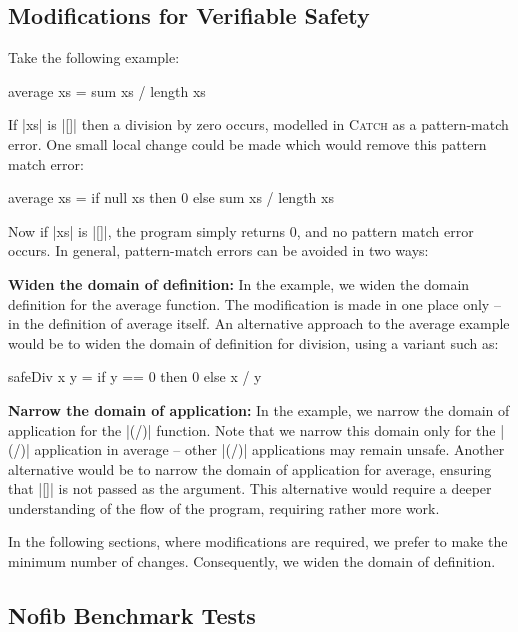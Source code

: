 \documentclass[preprint]{sigplanconf}
\newcommand{\C}[1]{\textsf{#1}}
\newcommand{\catch}{\textsc{Catch}}
\newcommand{\para}[1]{\vspace{2mm}\noindent\textbf{#1}}
\begin{document}
\subsection{Modifications for Verifiable Safety}
\label{sec:safety}

Take the following example:

\begin{code}
average xs = sum xs / length xs
\end{code}

If |xs| is |[]| then a division by zero occurs, modelled in \catch{} as a pattern-match error. One small local change could be made which would remove this pattern match error:

\begin{code}
average xs = if null xs then 0 else sum xs / length xs
\end{code}

\noindent Now if |xs| is |[]|, the program simply returns 0, and no pattern match error occurs. In general, pattern-match errors can be avoided in two ways:

\para{Widen the domain of definition:} In the example, we widen the domain definition for the \C{average} function. The modification is made in one place only -- in the definition of \C{average} itself. An alternative approach to the \C{average} example would be to widen the domain of definition for division, using a variant such as:

\begin{code}
safeDiv x y = if y == 0 then 0 else x / y
\end{code}


\para{Narrow the domain of application:} In the example, we narrow the domain of application for the |(/)| function.  Note that we narrow this domain only for the |(/)| application in \C{average} -- other |(/)| applications may remain unsafe. Another alternative would be to narrow the domain of application for \C{average}, ensuring that |[]| is not passed as the argument. This alternative would require a deeper understanding of the flow of the program, requiring rather more work.

In the following sections, where modifications are required, we prefer to make the minimum number of changes. Consequently, we widen the domain of definition.

\subsection{Nofib Benchmark Tests}
\label{sec:imaginary}
\end{document}
